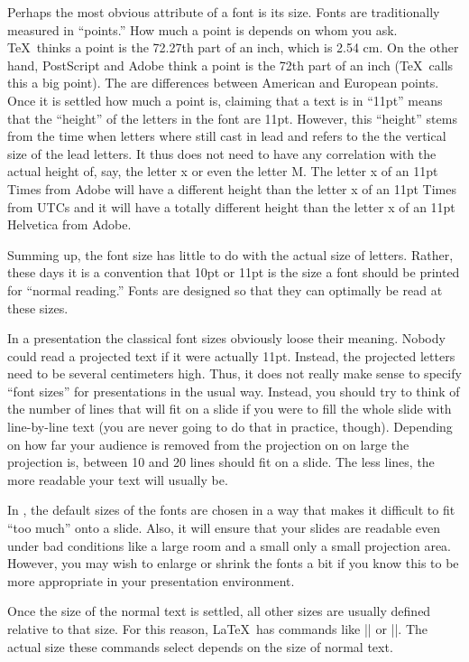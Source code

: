 \label{section-sizes}

Perhaps the most obvious attribute of a font is its size. Fonts are
traditionally measured in ``points.'' How much a point is depends on
whom you ask. \TeX\ thinks a point is the 72.27th part of an inch,
which is 2.54 cm. On the other hand, PostScript and Adobe think a
point is the 72th part of an inch (\TeX\ calls this a big point). The
are differences between American and European points. Once it is
settled how much a point is, claiming that a text is in ``11pt'' means
that the ``height'' of the letters in the font are 11pt. However, this
``height'' stems from the time when letters where still cast in lead
and refers to the the vertical size of the lead letters. It thus does
not need to have any correlation with the actual height of, say, the
letter x or even the letter M. The letter x of an 11pt Times from
Adobe will have a different height than the letter x of an 11pt Times
from UTCs and it will have a totally different height than the letter
x of an 11pt Helvetica from Adobe.

Summing up, the font size has little to do with the actual size of
letters. Rather, these days it is a convention that 10pt or 11pt is
the size a font should be printed for ``normal reading.'' Fonts are
designed so that they can optimally be read at these sizes.

In a presentation the classical font sizes obviously loose their
meaning. Nobody could read a projected text if it were actually
11pt. Instead, the projected letters need to be several centimeters
high. Thus, it does not really make sense to specify ``font sizes''
for presentations in the usual way. Instead, you should try to think
of the number of lines that will fit on a slide if you were to fill
the whole slide with line-by-line text (you are never going to do that
in practice, though). Depending on how far your audience is removed
from the projection on on large the projection is, between 10 and 20
lines should fit on a slide. The less lines, the more readable your
text will usually be.

In \beamer, the default sizes of the fonts are chosen in a way that
makes it difficult to fit ``too much'' onto a slide. Also, it will
ensure that your slides are readable even under bad conditions like a
large room and a small only a small projection area. However, you may
wish to enlarge or shrink the fonts a bit if you know this to be more
appropriate in your presentation environment.

Once the size of the normal text is settled, all other sizes are
usually defined relative to that size. For this reason, \LaTeX\ has 
commands like |\large| or |\small|. The actual size these commands
select depends on the size of normal text.

